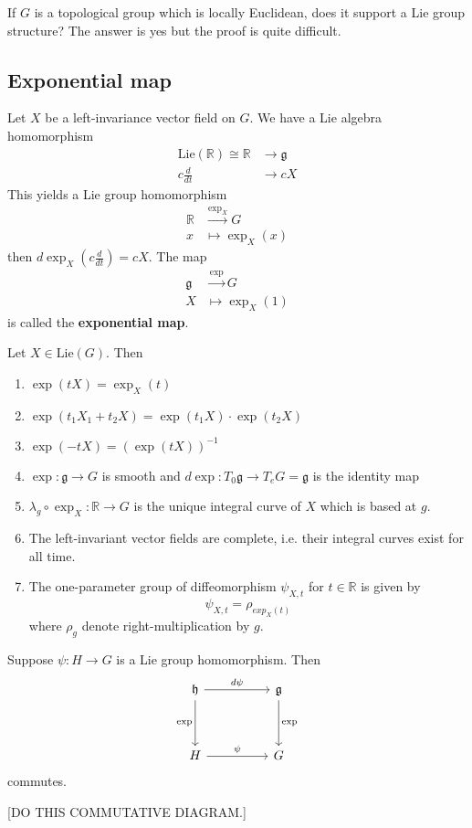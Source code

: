 \documentclass[11pt,a4paper]{scrarticle}
\theoremstyle{definition}
\theoremstyle{greenbox}
\newcommand{\R}{\mathbb{R}}
\begin{document}
If $ G $ is a topological group which is locally Euclidean, does it support a Lie group structure? The answer is yes but the proof is quite difficult.

\subsection*{Exponential map}  
Let $ X  $ be a left-invariance vector field on $ G $. We have a Lie algebra homomorphism \begin{align*}
    \text{Lie}(\R) \cong \R & \to \mathfrak{g} \\
    c \frac{d}{dt} & \to cX
\end{align*}
This yields a Lie group homomorphism \begin{align*}
    \R & \xrightarrow{\exp_{X}}  G  \\
    x & \mapsto \exp_{X}(x)
\end{align*}
then $ d \exp_{X}(c \frac{d}{dt}) = cX $. The map \begin{align*}
    \mathfrak{g} & \xrightarrow{\exp} G \\
    X & \mapsto \exp_{X}(1) 
\end{align*}
is called the \textbf{exponential map}. 
\begin{thm}\label{expo}
    Let $ X \in \text{Lie}(G) $. Then \begin{enumerate}
        \item $ \exp(tX) = \exp_{X}(t) $ 
        \item $ \exp(t_{1}X_{1}+t_{2}X) = \exp(t_{1}X) \cdot \exp(t_{2}X) $ 
        \item $ \exp(-tX) = ( \exp(tX))^{-1} $ 
        \item $ \exp : \mathfrak{g} \to G $  is smooth and $ d \exp : T_{0} \mathfrak{g} \to T_{e}G = \mathfrak{g} $ is the identity map 
        \item $ \lambda_{g} \circ \exp_{X} : \R \to G  $ is the unique integral curve of $ X $ which is based at $ g $.
        \item The left-invariant vector fields are complete, i.e. their integral curves exist for all time.
        \item The one-parameter group of diffeomorphism $ \psi_{X,t}  $ for $ t \in \R $ is given by 
        \[ \psi_{X,t} = \rho_{exp_{X}(t)} \]
        where $ \rho_{g} $ denote right-multiplication by $ g $.
    \end{enumerate}
\end{thm}
\begin{thm}
    Suppose $ \psi : H \to G $ is a Lie group homomorphism. Then 
    \[\begin{tikzcd}[ampersand replacement=\&]
        { \mathfrak{h}} \&\& { \mathfrak{g}} \\
        \\
        {H} \&\& G
        \arrow["d \psi", from=1-1, to=1-3]
        \arrow["\psi", from=3-1, to=3-3]
        \arrow["\exp", from=1-3, to=3-3]
        \arrow["{ \exp}"', from=1-1, to=3-1]
    \end{tikzcd}\] commutes.
\end{thm}
[DO THIS COMMUTATIVE DIAGRAM.]
\end{document}
